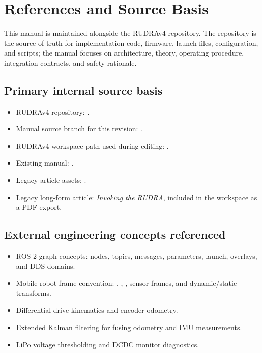 \chapter*{References and Source Basis}

This manual is maintained alongside the RUDRAv4 repository. The repository is the source of truth for implementation code, firmware, launch files, configuration, and scripts; the manual focuses on architecture, theory, operating procedure, integration contracts, and safety rationale.

\section*{Primary internal source basis}
\begin{itemize}
  \item RUDRAv4 repository: \href{\RepoBaseUrl}{\texttt{\RepoBaseUrl}}.
  \item Manual source branch for this revision: \texttt{\RepoBranch}.
  \item RUDRAv4 workspace path used during editing: .
  \item Existing manual: .
  \item Legacy article assets: .
  \item Legacy long-form article: \emph{Invoking the RUDRA}, included in the workspace as a PDF export.
\end{itemize}

\section*{External engineering concepts referenced}
\begin{itemize}
  \item ROS 2 graph concepts: nodes, topics, messages, parameters, launch, overlays, and DDS domains.
  \item Mobile robot frame convention: , , , sensor frames, and dynamic/static transforms.
  \item Differential-drive kinematics and encoder odometry.
  \item Extended Kalman filtering for fusing odometry and IMU measurements.
  \item LiPo voltage thresholding and DCDC monitor diagnostics.
\end{itemize}


